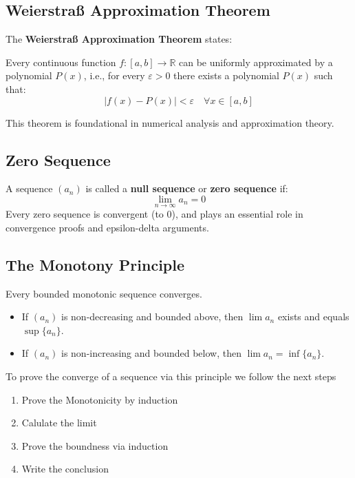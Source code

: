 \subsection{Weierstraß Approximation Theorem}

The \textbf{Weierstraß Approximation Theorem} states:

Every continuous function \(f: [a, b] \rightarrow \mathbb{R}\) can be uniformly approximated by a polynomial \(P(x)\), i.e., for every \(\varepsilon > 0\) there exists a polynomial \(P(x)\) such that:
\[
|f(x) - P(x)| < \varepsilon \quad \forall x \in [a, b]
\]

This theorem is foundational in numerical analysis and approximation theory.

\subsection{Zero Sequence}

A sequence \((a_n)\) is called a \textbf{null sequence} or \textbf{zero sequence} if:
\[
\lim_{n \to \infty} a_n = 0
\]
Every zero sequence is convergent (to 0), and plays an essential role in convergence proofs and epsilon-delta arguments.

\subsection{The Monotony Principle}

Every bounded monotonic sequence converges.

\begin{itemize}[label=\(-\)]
\item If \((a_n)\) is non-decreasing and bounded above, then \(\lim a_n\) exists and equals \(\sup \{a_n\}\).
\item If \((a_n)\) is non-increasing and bounded below, then \(\lim a_n = \inf \{a_n\}\).
\end{itemize}

To prove the converge of a sequence via this principle we follow the next steps

\begin{enumerate}
    \item Prove the Monotonicity by induction
    \item Calulate the limit
    \item Prove the boundness via induction
    \item Write the conclusion
\end{enumerate}

